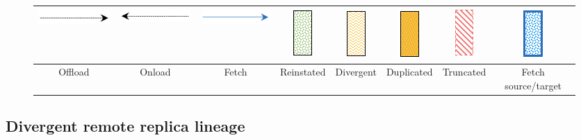 \documentclass{article}
\begin{document}
\begin{figure}[h!]
	\centering
	\renewcommand{\arraystretch}{2} %
	\begin{tabular}{|c|c|c|c|c|c|c|c|}
		\hline
		 \includegraphics[scale=0.4]{offload.png}  & \includegraphics[scale=0.4]{onload.png} & \includegraphics[scale=0.4]{fetch.png} &  \includegraphics[scale=0.4]{restored.png} & \includegraphics[scale=0.4]{divergent.png} & \includegraphics[scale=0.4]{duplicated.png} & \includegraphics[scale=0.4]{truncated.png} &  \includegraphics[scale=0.4]{fetch record.png} \\
		 \hline
		Offload & Onload & Fetch & Reinstated & Divergent & Duplicated & Truncated & Fetch source/target \\
		\hline
	\end{tabular}
\end{figure}

\subsection{Divergent remote replica lineage}
\end{document}
